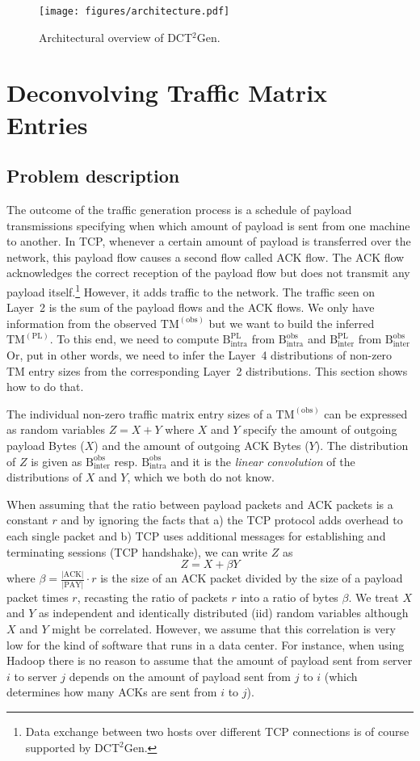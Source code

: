 \documentclass[journal,10pt]{IEEEtran}
\newcommand{\genname}{DCT${^2}$Gen}
\newcommand{\lt}{Layer~2}
\newcommand{\lf}{Layer~4}
\newcommand{\obstm}{\ensuremath{\mathrm{TM}^{(\mathrm{obs})}}}
\newcommand{\pltm}{\ensuremath{\mathrm{TM}^{(\mathrm{PL})}}}
\newcommand{\bytes}[2]{\ensuremath{\mathrm{B}^{\mathrm{#1}}_{\mathrm{#2}}}}
\begin{document}
\begin{figure}
	\texttt{[image: figures/architecture.pdf]}
	\caption{Architectural overview of \genname{}.}
	\label{fig:architecture}
\end{figure}

\section{Deconvolving Traffic Matrix Entries}
\label{sec:deconvolve}
\subsection{Problem description}
\label{sec:deconvolve_desc}
	The outcome of the traffic generation process is a schedule of payload transmissions specifying when which amount of payload is sent from one machine
	to another. 
	In TCP, whenever a certain amount of payload is transferred over the network, this payload flow causes a second flow called ACK flow.
	The ACK flow acknowledges the correct reception of the payload flow
	but does not transmit any payload itself.\footnote{Data exchange between two hosts over different TCP connections is of course supported by \genname{}.} 
	However, it adds traffic to the network. 
	The traffic seen on \lt{} is the sum of the payload flows and the ACK flows.
	We only have information from the observed \obstm{} but we want to build the inferred \pltm{}. 
	To this end, we need to compute \bytes{PL}{intra} from \bytes{obs}{intra} and \bytes{PL}{inter} from \bytes{obs}{inter}
	Or, put in other words, we need to infer the \lf{} distributions of non-zero TM entry sizes from the corresponding \lt{} distributions.
	This section shows how to do that.
		
	The individual non-zero traffic matrix entry sizes of a \obstm{} can be expressed as random variables $Z = X+Y$ where $X$ and $Y$
	specify the amount of outgoing payload Bytes ($X$) and the amount of outgoing ACK Bytes ($Y$).
	The distribution of $Z$ is given as \bytes{obs}{inter} resp. \bytes{obs}{intra} and it is the \emph{linear convolution} of the distributions of $X$ and $Y$,
	which we both do not know.
	
	When assuming that the ratio between payload packets and ACK packets is a constant $r$ and by ignoring the facts that a) the TCP protocol
	adds overhead to each single packet and b) TCP uses additional messages for establishing and terminating sessions (TCP handshake), we can write $Z$ as
	\[Z = X + \beta Y\]
	where $\beta = \frac{|\mathrm{ACK}|}{|\mathrm{PAY}|} \cdot r$ is the size of an ACK packet divided by the size of a payload packet times $r$,
	recasting the ratio of packets $r$ into a ratio of bytes $\beta$.
	We treat $X$ and $Y$ as independent and identically distributed (iid) random variables
	although $X$ and $Y$ might be correlated.
	However, we assume that this correlation is very low for the kind of software that runs in a data center.
	For instance, when using Hadoop there is no reason to assume that the amount of payload 
	sent from server $i$ to server $j$ depends on the amount of payload sent from $j$ to $i$ (which determines how many ACKs are sent from $i$ to $j$).
	
\end{document}
